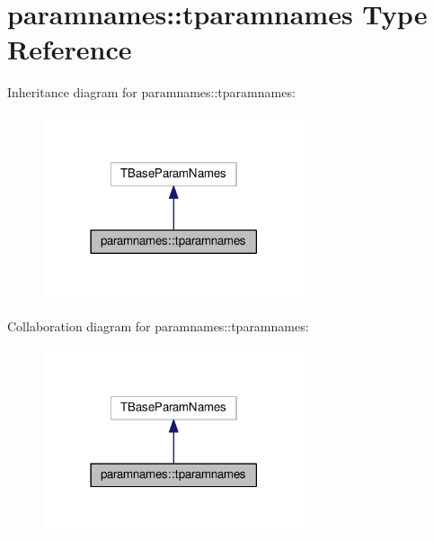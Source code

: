 \hypertarget{structparamnames_1_1tparamnames}{}\section{paramnames\+:\+:tparamnames Type Reference}
\label{structparamnames_1_1tparamnames}


Inheritance diagram for paramnames\+:\+:tparamnames\+:
\nopagebreak
\begin{figure}[H]
\begin{center}
\leavevmode
\includegraphics[width=218pt]{structparamnames_1_1tparamnames__inherit__graph}
\end{center}
\end{figure}


Collaboration diagram for paramnames\+:\+:tparamnames\+:
\nopagebreak
\begin{figure}[H]
\begin{center}
\leavevmode
\includegraphics[width=218pt]{structparamnames_1_1tparamnames__coll__graph}
\end{center}
\end{figure}
